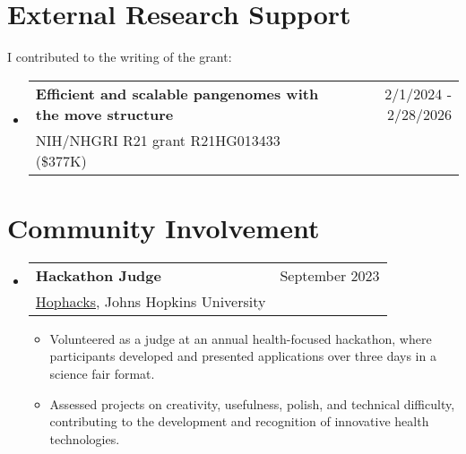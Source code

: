\documentclass[A4,11pt]{article}
\makeatletter
\newcommand{\CVItem}[1]{
  \item\small{
    {#1 \vspace{-2pt}}
  }
}
\newcommand{\CVSubheading}[4]{
  \vspace{-2pt}\item
    \begin{tabular*}{0.97\textwidth}[t]{l@{\extracolsep{\fill}}r}
      \textbf{#1} & #2 \\
      \small#3 & \small #4 \\
    \end{tabular*}\vspace{-7pt}
}
\newcommand{\CVSubHeadingListStart}{\begin{itemize}[leftmargin=0.5cm, label={}]}
\newcommand{\CVSubHeadingListEnd}{\end{itemize}}
\newcommand{\CVItemListStart}{\begin{itemize}}
\newcommand{\CVItemListEnd}{\end{itemize}\vspace{-5pt}}
\makeatother
\begin{document}

  \section{External Research Support}
  I contributed to the writing of the grant:\\
  \CVSubHeadingListStart
  \CVSubheading
  {Efficient and scalable pangenomes with the move structure} {2/1/2024 - 2/28/2026}
  {NIH/NHGRI R21 grant R21HG013433 (\$377K)}{}
  \CVSubHeadingListEnd

  \section{Community Involvement}
  \CVSubHeadingListStart
  \CVSubheading
  {Hackathon Judge} {September 2023}
  {\href{https://www.hophacks.com/}{Hophacks}, Johns Hopkins University}{}
  \CVItemListStart
  \CVItem{Volunteered as a judge at an annual health-focused hackathon, where participants developed and presented applications over three days in a science fair format.}
  \CVItem{Assessed projects on creativity, usefulness, polish, and technical difficulty, contributing to the development and recognition of innovative health technologies.}
  \CVItemListEnd
  \CVSubHeadingListEnd
\end{document}
